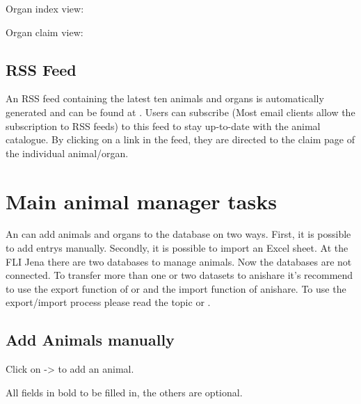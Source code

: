 \documentclass[letterpaper,10pt,openany,oneside,english]{sphinxmanual}
\begin{document}
Organ index view:

\noindent{}

Organ claim view:

\noindent{}


\subsection{RSS Feed}
\label{\detokenize{index:rss-feed}}
An RSS feed containing the latest ten animals and organs is automatically generated and can be found at
. Users can subscribe (Most email clients allow the subscription
to RSS feeds) to this feed to stay up-to-date with the animal catalogue. By clicking on a link in
the feed, they are directed to the claim page of the individual animal/organ.

\noindent{}


\section{Main animal manager tasks}
\label{\detokenize{index:main-animal-manager-tasks}}
An  can add animals and organs to the database on two ways. First, it is possible to
add entrys manually. Secondly, it is possible to import an Excel sheet. At the FLI Jena there are two
databases to manage animals. Now the databases are not connected. To transfer more than one or two datasets
to anishare it’s recommend to use the export function of  or  and the import function of anishare.
To use the export/import process please read the topic  or .

\noindent{}


\subsection{Add Animals manually}
\label{\detokenize{index:add-animals-manually}}
Click on  -\textgreater{}  to add an animal.

\noindent{}

All fields in bold  to be filled in, the others are optional.
\end{document}
